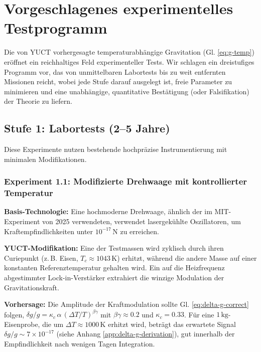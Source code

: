 \documentclass[12pt]{article}
\theoremstyle{remark}
\begin{document}
	\section{Vorgeschlagenes experimentelles Testprogramm}
	\label{sec:experiments}
	
	Die von YUCT vorhergesagte temperaturabhängige Gravitation (Gl. \ref{eq:g-temp}) eröffnet ein reichhaltiges Feld experimenteller Tests.  
	Wir schlagen ein dreistufiges Programm vor, das von unmittelbaren Labortests bis zu weit entfernten Missionen reicht, wobei jede Stufe darauf ausgelegt ist, freie Parameter zu minimieren und eine unabhängige, quantitative Bestätigung (oder Falsifikation) der Theorie zu liefern.
	
	\subsection{Stufe 1: Labortests (2–5 Jahre)}
	\label{subsec:lab-tests}
	
	Diese Experimente nutzen bestehende hochpräzise Instrumentierung mit minimalen Modifikationen.
	
	\subsubsection{Experiment 1.1: Modifizierte Drehwaage mit kontrollierter Temperatur}
	
	\textbf{Basis-Technologie:} Eine hochmoderne Drehwaage, ähnlich der im MIT-Experiment von 2025 \cite{MIT2025} verwendeten, verwendet lasergekühlte Oszillatoren, um Kraftempfindlichkeiten unter \(10^{-17}\,\mathrm{N}\) zu erreichen.
	
	\textbf{YUCT-Modifikation:} Eine der Testmassen wird zyklisch durch ihren Curiepunkt (z. B. Eisen, \(T_c\approx1043\,\mathrm{K}\)) erhitzt, während die andere Masse auf einer konstanten Referenztemperatur gehalten wird. Ein auf die Heizfrequenz abgestimmter Lock-in-Verstärker extrahiert die winzige Modulation der Gravitationskraft.
	
	\textbf{Vorhersage:} Die Amplitude der Kraftmodulation sollte Gl. \ref{eq:delta-g-correct} folgen, \(\delta g/g = \kappa_c\,\alpha\,(\Delta T/T)^{\beta\gamma}\) mit \(\beta\gamma\approx0.2\) und \(\kappa_c=0.33\). Für eine \(1\,\mathrm{kg}\)-Eisenprobe, die um \(\Delta T\approx1000\,\mathrm{K}\) erhitzt wird, beträgt das erwartete Signal \(\delta g/g \sim 7\times10^{-17}\) (siehe Anhang \ref{app:delta-g-derivation}), gut innerhalb der Empfindlichkeit nach wenigen Tagen Integration.
	
\end{document}

